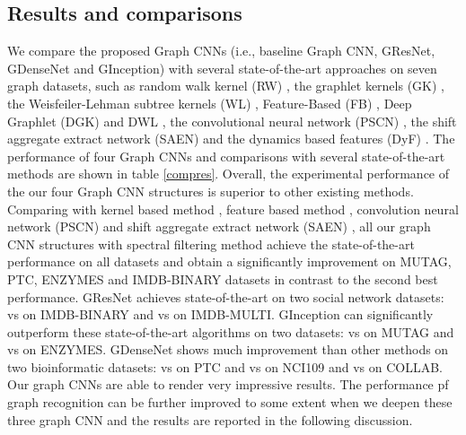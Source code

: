 \documentclass[journal]{IEEEtran}
\begin{document}
\subsection{Results and comparisons}
We compare the proposed Graph CNNs (i.e., baseline Graph CNN, G\underline{\hspace{0.5em}}ResNet, G\underline{\hspace{0.5em}}DenseNet and G\underline{\hspace{0.5em}}Inception) with several state-of-the-art approaches on seven graph datasets, such as random walk kernel (RW) \cite{rw2003}, the graphlet kernels (GK) \cite{gk2009}, the Weisfeiler-Lehman subtree kernels (WL) \cite{wl2011}, Feature-Based (FB) \cite{BrunaZSL13}, Deep Graphlet (DGK) and DWL \cite{DGKandDWL2015}, the convolutional neural network (PSCN) \cite{niepert2016learning}, the shift aggregate extract network (SAEN) \cite{saen2017} and the dynamics based features (DyF) \cite{DyGraph2017}.
The performance of four Graph CNNs and comparisons with several state-of-the-art methods are shown in table \ref{compres}.
Overall, the experimental performance of the our four Graph CNN structures is superior to other existing methods.
Comparing with kernel based method \cite{rw2003,gk2009,wl2011,DGKandDWL2015}, feature based method \cite{BrunaZSL13,DyGraph2017}, convolution neural network (PSCN) \cite{niepert2016learning} and shift aggregate extract network (SAEN) \cite{saen2017}, all our graph CNN structures with spectral filtering method achieve the state-of-the-art performance on all datasets and obtain a significantly improvement on MUTAG, PTC, ENZYMES and IMDB-BINARY datasets in contrast to the second best performance.
G\underline{\hspace{0.5em}}ResNet achieves state-of-the-art on two social network datasets:  vs  \cite{DyGraph2017} on IMDB-BINARY and  vs  \cite{wl2011} on IMDB-MULTI.
G\underline{\hspace{0.5em}}Inception can significantly outperform these state-of-the-art algorithms on two datasets:  vs  \cite{niepert2016learning} on MUTAG and  vs  \cite{DGKandDWL2015} on ENZYMES.
G\underline{\hspace{0.5em}}DenseNet shows much improvement than other methods on two  bioinformatic datasets:  vs  \cite{niepert2016learning} on PTC and  vs  \cite{DGKandDWL2015} on NCI109 and  vs  \cite{DyGraph2017} on COLLAB.
Our graph CNNs are able to render very impressive results. The performance pf graph recognition can be further improved to some extent when we deepen these three graph CNN and the results are reported in the following discussion.
\end{document}
